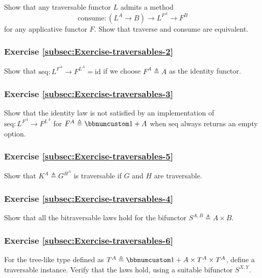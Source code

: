 Show that any traversable functor $L$ admits a method 
\[
\text{consume}:(L^{A}\rightarrow B)\rightarrow L^{F^{A}}\rightarrow F^{B}
\]
for any applicative functor $F$. Show that traverse and consume are
equivalent.

\subsubsection{Exercise \label{subsec:Exercise-traversables-2}\ref{subsec:Exercise-traversables-2}}

Show that $\text{seq}:L^{F^{A}}\rightarrow F^{L^{A}}=\text{id}$ if
we choose $F^{A}\triangleq A$ as the identity functor. 

\subsubsection{Exercise \label{subsec:Exercise-traversables-3}\ref{subsec:Exercise-traversables-3}}

Show that the identity law is not satisfied by an implementation of
$\text{seq}:L^{F^{A}}\rightarrow F^{L^{A}}$ for $F^{A}\triangleq\bbnum 1+A$
when $\text{seq}$ always returns an empty option.

\subsubsection{Exercise \label{subsec:Exercise-traversables-5}\ref{subsec:Exercise-traversables-5}}

Show that $K^{A}\triangleq G^{H^{A}}$ is traversable if $G$ and
$H$ are traversable.

\subsubsection{Exercise \label{subsec:Exercise-traversables-4}\ref{subsec:Exercise-traversables-4}}

Show that all the bitraversable laws hold for the bifunctor $S^{A,B}\triangleq A\times B$.

\subsubsection{Exercise \label{subsec:Exercise-traversables-6}\ref{subsec:Exercise-traversables-6}}

For the tree-like type defined as $T^{A}\triangleq\bbnum 1+A\times T^{A}\times T^{A}$,
define a traversable instance. Verify that the laws hold, using a
suitable bifunctor $S^{X,Y}$.

